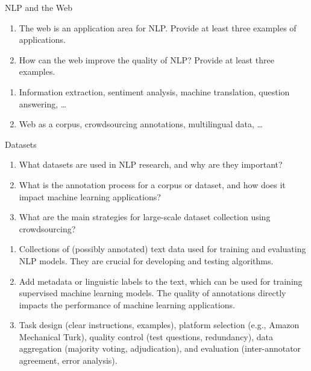 \documentclass{article}
\begin{document}

\begin{exercise}{NLP and the Web}
  \begin{enumerate}
    \item The web is an application area for NLP. Provide at least three examples of applications.
    \item How can the web improve the quality of NLP? Provide at least three examples.
  \end{enumerate}

  \begin{solution}
    \begin{enumerate}
      \item Information extraction, sentiment analysis, machine translation, question answering, …
      \item Web as a corpus, crowdsourcing annotations, multilingual data, …
    \end{enumerate}
  \end{solution}
\end{exercise}

\begin{exercise}{Datasets}
  \begin{enumerate}
    \item What datasets are used in NLP research, and why are they important?
    \item What is the annotation process for a corpus or dataset, and how does it impact machine learning applications?
    \item What are the main strategies for large-scale dataset collection using crowdsourcing?
  \end{enumerate}

  \begin{solution}
    \begin{enumerate}
      \item Collections of (possibly annotated) text data used for training and evaluating NLP models. They are crucial for developing and testing algorithms.
      \item Add metadata or linguistic labels to the text, which can be used for training supervised machine learning models. The quality of annotations directly impacts the performance of machine learning applications.
      \item Task design (clear instructions, examples), platform selection (e.g., Amazon Mechanical Turk), quality control (test questions, redundancy), data aggregation (majority voting, adjudication), and evaluation (inter-annotator agreement, error analysis).
    \end{enumerate}
  \end{solution}
\end{exercise}
\end{document}
